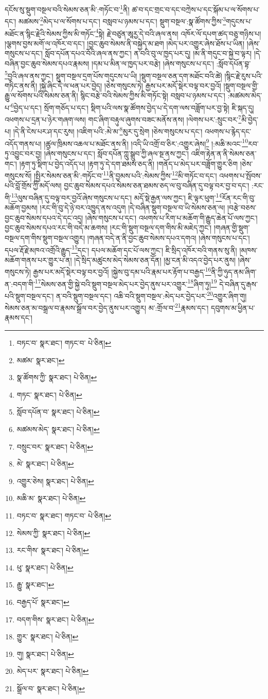དངོས་སུ་སྡུག་བསྔལ་བའི་སེམས་ཅན་མི་:གཏོང་བ་\footnote{བཏང་བ་  སྣར་ཐང་། གཏང་བ་  པེ་ཅིན། }ནི། ཚ་བ་དང་གྲང་བ་དང་བཀྲེས་པ་དང་སྐོམ་པ་ལ་སོགས་པ་དང་། མཚམས་\footnote{མཚམ་  སྣར་ཐང་། }མེད་པ་ལ་སོགས་པ་དང་། བསླབ་པ་ཉམས་པ་དང་། སྡུག་བསྔལ་:སྣ་ཚོགས་ཀྱིས་\footnote{སྣ་ཚོགས་ཀྱི་  སྣར་ཐང་།  པེ་ཅིན། }གདུངས་པ་མཐོང་ན་སྙིང་རྗེའི་སེམས་ཀྱིས་མི་གཏོང་\footnote{གཏང་  སྣར་ཐང་།  པེ་ཅིན། }སྟེ། རྗེ་བཙུན་ཨཱརྱ་དེ་བའི་ཞལ་ནས། འཁོར་ལོ་དཔག་ཚད་བཅུ་གཉིས་པ། །ལྕགས་བྱས་མགོ་ལ་འཁོར་བ་དང་། །བྱང་ཆུབ་སེམས་ནི་བསྐྱེད་མ་ཐག །མེད་པར་འགྱུར་ཞེས་ཐོས་པ་ཡིན། །ཞེས་གསུངས་པ་དང་། སློབ་དཔོན་དཔའ་བོའི་ཞལ་ནས་ཀྱང་། ན་བའི་བུ་ལ་ཁྱད་པར་དུ། །མ་ནི་གདུང་བ་སྐྱེ་བ་ལྟར། །དེ་བཞིན་བྱང་ཆུབ་སེམས་དཔའ་རྣམས། །དམ་པ་མིན་ལ་ཁྱད་པར་བརྩེ། །ཞེས་གསུངས་པ་དང་། :སློབ་དཔོན་བྷ་\footnote{སློབ་དཔོན་བ་  སྣར་ཐང་།  པེ་ཅིན། }བྱའི་ཞལ་ནས་ཀྱང་། སྡུག་བསྔལ་དྲག་པོས་གདུངས་པ་ཡི། །སྡུག་བསྔལ་ཅན་དག་མཐོང་བའི་ཚེ། །སྙིང་རྗེ་རུས་པའི་གཏིང་ནས་ནི། །སྐྱེ་ཞིང་དེ་ལ་ཕན་པར་བྱེད། །ཅེས་གསུངས་ཏེ། རྒྱས་པར་མདོ་སྡེར་བལྟ་བར་བྱའོ། །སྡུག་བསྔལ་གྱི་རྒྱུ་ལ་སོགས་པའི་སེམས་ཅན་ནི། སྙིང་བརྩེ་བའི་སེམས་ཀྱིས་མི་གཏོང་སྟེ། བསླབ་པ་ཉམས་པ་དང་། :མཚམས་མེད་པ་\footnote{མཚམས་མེད་  སྣར་ཐང་།  པེ་ཅིན། }བྱེད་པ་དང་། སྲོག་གཅོད་པ་དང་། སྡིག་པའི་ལས་སྣ་ཚོགས་བྱེད་པ་དེ་དག་ལས་བཟློག་པར་བྱ་སྟེ། ཇི་སྐད་དུ། འཕགས་པ་དྲན་པ་ཉེར་གཞག་ལས། གང་ཞིག་བརྟུལ་ཞུགས་བཟང་མནོས་ནས། །ལེགས་པར་:སྲུང་བར་\footnote{བསྲུང་བར་  སྣར་ཐང་།  པེ་ཅིན། }མི་བྱེད་པ། །དེ་ནི་ངེས་པར་ཤ་དང་རུས། །འཇིག་པའི་:མེ་མ་\footnote{མེ་  སྣར་ཐང་།  པེ་ཅིན། }མུར་དུ་སྲེག །ཅེས་གསུངས་པ་དང་། འཕགས་པ་རྙེད་དང་འདོད་གནས་པ། །ཚུལ་ཁྲིམས་འཆལ་པ་མཐོང་ནས་ནི། །འདི་ཡི་འགྲོ་བ་ཅིར་:འགྱུར་ཞེས།\footnote{འགྱུར་ཅེས།  སྣར་ཐང་།  པེ་ཅིན། } །:མཆི་མའང་\footnote{མཆི་མ་  སྣར་ཐང་།  པེ་ཅིན། }རབ་ཏུ་འབྱུང་བར་བྱ། །ཞེས་གསུངས་པ་དང་། སློབ་དཔོན་ཀླུ་སྒྲུབ་ཀྱི་ཞལ་སྔ་ནས་ཀྱང་། འཇིག་རྟེན་ན་ནི་སེམས་ཅན་གང་། །རྟག་ཏུ་སྡིག་པ་བྱེད་འདོད་པ། །རྟག་ཏུ་དེ་དག་ཐམས་ཅད་ནི། །གནོད་པ་མེད་པར་བཟློག་གྱུར་ཅིག །ཅེས་གསུངས་སོ། །སྤྱིར་སེམས་ཅན་མི་:གཏོང་བ་\footnote{བཏང་བ་  སྣར་ཐང་། གཏང་བ་  པེ་ཅིན། }ནི་བྱམས་པའི་:སེམས་ཀྱིས་\footnote{སེམས་ཀྱི་  སྣར་ཐང་།  པེ་ཅིན། }མི་གཏོང་བ་དང་། འཕགས་པ་སྤོབས་པའི་བློ་གྲོས་ཀྱི་མདོ་ལས། བྱང་ཆུབ་སེམས་དཔའ་སེམས་ཅན་ཐམས་ཅད་ལ་བུ་བཞིན་དུ་བལྟ་བར་བྱ་བ་དང་། :རང་གི་\footnote{རང་གིས་  སྣར་ཐང་།  པེ་ཅིན། }ལུས་བཞིན་དུ་བལྟ་བར་བྱའོ་ཞེས་གསུངས་པ་དང་། མདོ་སྡེ་རྒྱན་ལས་ཀྱང་། ཇི་ལྟར་ཕུག་\footnote{ཕུ་  སྣར་ཐང་།  པེ་ཅིན། }རོན་རང་གི་བུ་མཆོག་བྱམས། །རང་གི་བུ་དེ་ཉེ་བར་འཁྱུད་ནས་འདུག །དེ་བཞིན་སྡུག་བསྔལ་བ་ཡི་སེམས་ཅན་ལ། །བརྩེ་བཅས་བྱང་ཆུབ་སེམས་དཔའ་དེ་དང་འདྲ། །ཞེས་གསུངས་པ་དང་། འཕགས་པ་རིག་པ་མཆོག་གི་རྒྱུད་ཆེན་པོ་ལས་ཀྱང་། བྱང་ཆུབ་སེམས་དཔའ་རང་གི་བདེ་མ་ཆགས། །རང་གི་སྡུག་བསྔལ་དག་གིས་མི་མཇེད་ཀྱང་། །གཞན་གྱི་སྡུག་བསྔལ་དག་གིས་སྡུག་བསྔལ་འགྱུར། །གཞན་བདེ་ན་ནི་བྱང་ཆུབ་སེམས་དཔའ་དགའ། །ཞེས་གསུངས་པ་དང་། དཔལ་རྡོ་རྗེ་མཁའ་འགྲོའི་རྒྱུད་\footnote{རྒྱུ་  སྣར་ཐང་། }དང་། དཔལ་མཆོག་དང་པོ་ལས་ཀྱང་། ཇི་སྲིད་འཁོར་བའི་གནས་སུ་ནི། །མཁས་མཆོག་གནས་པར་གྱུར་པ་ན། །དེ་སྲིད་མཚུངས་མེད་སེམས་ཅན་དོན། །མྱ་ངན་མི་འདའ་བྱེད་པར་ནུས། །ཞེས་གསུངས་ཏེ། རྒྱས་པར་མདོ་སྡེར་བལྟ་བར་བྱའོ། །སྐྱེས་བུ་དམ་པའི་རྣམ་པར་རྟོག་པ་བརྒྱད་\footnote{བརྒྱད་པོ་  སྣར་ཐང་། }ནི་ཀྱི་ཧུད་ནམ་ཞིག་ན་:བདག་གི་\footnote{བདག་གིས་  སྣར་ཐང་།  པེ་ཅིན། }སེམས་ཅན་གྱི་སྐྱེ་བའི་སྡུག་བསྔལ་མེད་པར་བྱེད་ནུས་པར་འགྱུར་\footnote{གྱུར་  སྣར་ཐང་།  པེ་ཅིན། }ཞིག་ཏུ།\footnote{གུ།  སྣར་ཐང་།  པེ་ཅིན། } དེ་བཞིན་དུ་རྒས་པའི་སྡུག་བསྔལ་དང་། ན་བའི་སྡུག་བསྔལ་དང་། འཆི་བའི་སྡུག་བསྔལ་:མེད་པར་བྱེད་པར་\footnote{མེད་པར་  སྣར་ཐང་།  པེ་ཅིན། }འགྱུར་ཞིག་གུ། སེམས་ཅན་མ་བསྒྲལ་བ་རྣམས་སྒྲོལ་བར་བྱེད་ནུས་པར་འགྱུར། མ་:གྲོལ་བ་\footnote{སྒྲོལ་བ་  སྣར་ཐང་།  པེ་ཅིན། }རྣམས་དང་། དབུགས་མ་ཕྱིན་པ་རྣམས་དང་། 